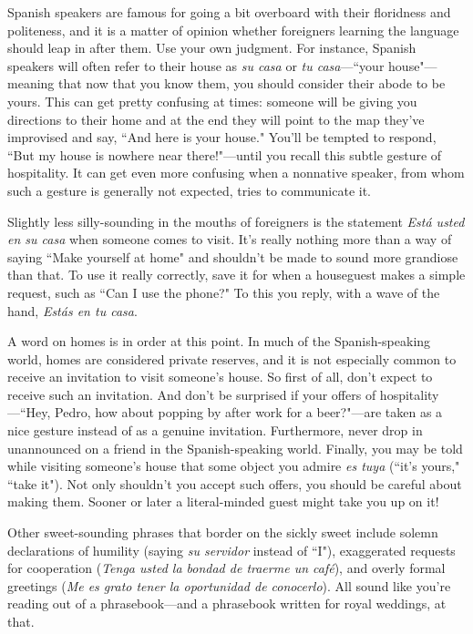 Spanish speakers are famous for going a bit overboard with
their floridness and politeness, and it is a matter of opinion whether
foreigners learning the language should leap in after them. Use your
own judgment. For instance, Spanish speakers will often refer to their
house as \emph{su casa} or \emph{tu casa}---``your house"---meaning that now that
you know them, you should consider their abode to be yours. This can
get pretty confusing at times: someone will be giving you directions to
their home and at the end they will point to the map they've improvised and say, ``And here is your house." You'll be tempted to respond,
``But my house is nowhere near there!"---until you recall this subtle
gesture of hospitality. It can get even more confusing when a nonnative speaker, from whom such a gesture is generally not expected,
tries to communicate it.

Slightly less silly-sounding in the mouths of foreigners is the
statement \emph{Está usted en su casa} when someone comes to visit. It's really nothing more than a way of saying ``Make yourself at home" and
shouldn't be made to sound more grandiose than that. To use it really
correctly, save it for when a houseguest makes a simple request, such
as ``Can I use the phone?" To this you reply, with a wave of the hand,
\emph{Estás en tu casa}.

A word on homes is in order at this point. In much of the
Spanish-speaking world, homes are considered private reserves, and it
is not especially common to receive an invitation to visit someone's
house. So first of all, don't expect to receive such an invitation. And
don't be surprised if your offers of hospitality---``Hey, Pedro, how about
popping by after work for a beer?"---are taken as a nice gesture instead
of as a genuine invitation. Furthermore, never drop in unannounced on
a friend in the Spanish-speaking world. Finally, you may be told while
visiting someone's house that some object you admire \emph{es tuya} (``it's
yours," ``take it"). Not only shouldn't you accept such offers, you
should be careful about making them. Sooner or later a literal-minded
guest might take you up on it!

Other sweet-sounding phrases that border on the sickly sweet
include solemn declarations of humility (saying \emph{su servidor} instead of
``I"), exaggerated requests for cooperation (\emph{Tenga usted la bondad de
	traerme un café}), and overly formal greetings (\emph{Me es grato tener la
	oportunidad de conocerlo}). All sound like you're reading out of a
phrasebook---and a phrasebook written for royal weddings, at that.

